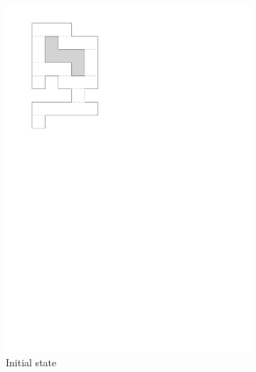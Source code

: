 \documentclass[english,gradu]{tktltiki2018}
\begin{document}
\begin{figure}\centering
	\begin{subfigure}[t]{0.15\textwidth}\centering
		\includegraphics[width=\textwidth,page=2]{fig/light2d}
		\caption{Initial state}\label{fig:light2d:start}
	\end{subfigure}
	\hfil
	\begin{subfigure}[t]{0.15\textwidth}\centering

\end{subfigure}
\end{figure}
\end{document}
